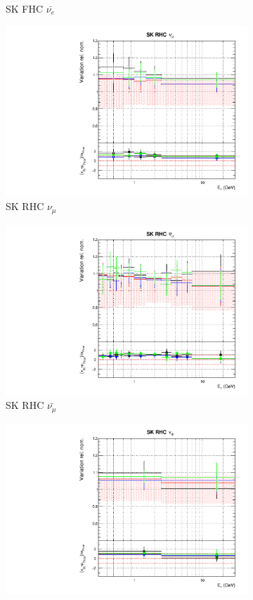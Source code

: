 \begin{figure}[!htbp]
\begin{subfigure}{0.45\textwidth}
  \caption{SK FHC $\bar{\nu_{e}}$}
\end{subfigure}
\begin{subfigure}{0.45\textwidth}
  \centering
  \includegraphics[width=0.75\linewidth]{figs/detcovbinflux_12}
  \caption{SK RHC $\nu_{\mu}$}
\end{subfigure}
\begin{subfigure}{0.45\textwidth}
  \centering
  \includegraphics[width=0.75\linewidth]{figs/detcovbinflux_13}
  \caption{SK RHC $\bar{\nu_{\mu}}$}
\end{subfigure}
\begin{subfigure}{0.45\textwidth}
  \centering
  \includegraphics[width=0.75\linewidth]{figs/detcovbinflux_14}

\end{subfigure}
\end{figure}
